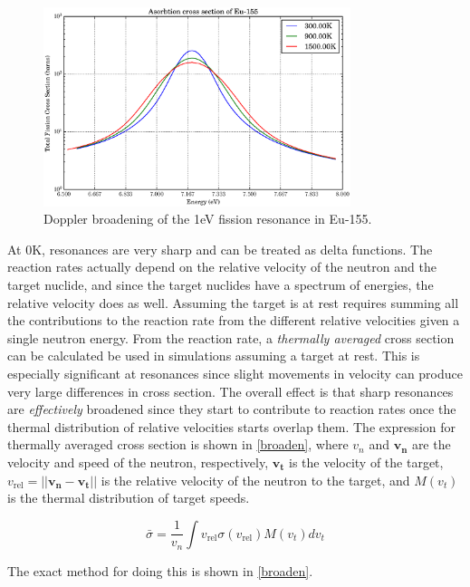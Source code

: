 \begin{figure}[h!]
  \centering
    \includegraphics[width=0.8\textwidth]{graphics/xs_eu_broaden.eps}
     \caption{Doppler broadening of the 1eV fission resonance in Eu-155.  \label{xs_eu_broaden}}
\end{figure}

At 0K, resonances are very sharp and can be treated as delta functions.  The reaction rates actually depend on the relative velocity of the neutron and the target nuclide, and since the target nuclides have a spectrum of energies, the relative velocity does as well.  Assuming the target is at rest requires summing all the contributions to the reaction rate from the different relative velocities given a single neutron energy.  From the reaction rate, a \emph{thermally averaged} cross section can be calculated be used in simulations assuming a target at rest.  This is especially significant at resonances since slight movements in velocity can produce very large differences in cross section.  The overall effect is that sharp resonances are \emph{effectively} broadened since they start to contribute to reaction rates once the thermal distribution of relative velocities starts overlap them.   The expression for thermally averaged cross section is shown in \eqref{broaden}, where $v_n$ and $\boldsymbol{v_n}$ are the velocity and speed of the neutron, respectively, $\boldsymbol{v_t}$ is the velocity of the target, $v_\mathrm{rel} = || \boldsymbol{v_n} -\boldsymbol{v_t}||$ is the relative velocity of the neutron to the target, and $M(v_t)$ is the thermal distribution of target speeds.

\begin{equation}
\bar{\sigma} = \frac{1}{v_n} \int v_\mathrm{rel} \sigma(v_\mathrm{rel}) M(v_t) dv_t
\label{broaden}
\end{equation}

The exact method for doing this is shown in \eqref{broaden}\cite{Cullen_Weisbin_1976}.

